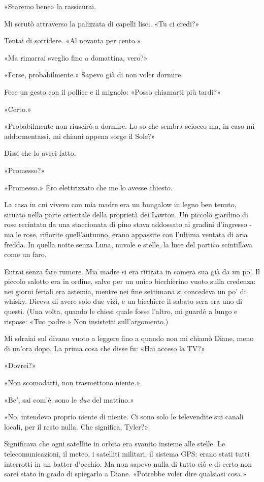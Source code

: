 «Staremo bene» la rassicurai.

Mi scrutò attraverso la palizzata di capelli lisci. «Tu ci credi?»

Tentai di sorridere. «Al novanta per cento.»

«Ma rimarrai sveglio fino a domattina, vero?»

«Forse, probabilmente.» Sapevo già di non voler dormire.

Fece un gesto con il pollice e il mignolo: «Posso chiamarti più tardi?»

«Certo.»

«Probabilmente non riuscirò a dormire. Lo so che sembra sciocco ma, in
caso mi addormentassi, mi chiami appena sorge il Sole?»

Dissi che lo avrei fatto.

«Promesso?»

«Promesso.» Ero elettrizzato che me lo avesse chiesto.

\separatorefiori

La casa in cui vivevo con mia madre era un bungalow in legno ben tenuto,
situato nella parte orientale della proprietà dei Lawton. Un piccolo
giardino di rose recintato da una staccionata di pino stava addossato ai
gradini d'ingresso - ma le rose, rifiorite quell'autunno, erano
appassite con l'ultima ventata di aria fredda. In quella notte senza
Luna, nuvole e stelle, la luce del portico scintillava come un faro.

Entrai senza fare rumore. Mia madre si era ritirata in camera sua già da
un po'. Il piccolo salotto era in ordine, salvo per un unico bicchierino
vuoto sulla credenza: nei giorni feriali era astemia, mentre nei fine
settimana si concedeva un po' di whisky. Diceva di avere solo due vizi,
e un bicchiere il sabato sera era uno di questi. (Una volta, quando le
chiesi quale fosse l'altro, mi guardò a lungo e rispose: «Tuo padre.»
Non insistetti sull'argomento.)

Mi sdraiai sul divano vuoto a leggere fino a quando non mi chiamò Diane,
meno di un'ora dopo. La prima cosa che disse fu: «Hai acceso la TV?»

«Dovrei?»

«Non scomodarti, non trasmettono niente.»

«Be', sai com'è, sono le \emph{due} del mattino.»

«No, intendevo proprio niente di niente. Ci sono solo le televendite sui
canali locali, per il resto nulla. Che significa, Tyler?»

Significava che ogni satellite in orbita era svanito insieme alle
stelle. Le telecomunicazioni, il meteo, i satelliti militari, il sistema
GPS: erano stati tutti interrotti in un batter d'occhio. Ma non sapevo
nulla di tutto ciò e di certo non sarei stato in grado di spiegarlo a
Diane. «Potrebbe voler dire qualsiasi cosa.»

